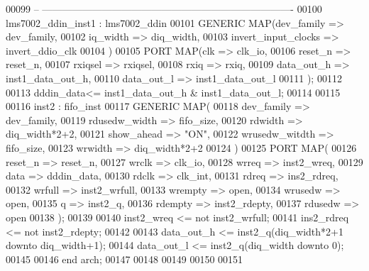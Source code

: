 \begin{DoxyCode}
00099 \textcolor{keyword}{-- ----------------------------------------------------------------------------}
00100 lms7002_ddin_inst1 : lms7002_ddin
00101 \textcolor{keywordflow}{GENERIC} \textcolor{keywordflow}{MAP}(dev_family              => dev_family,
00102                 iq_width                => diq_width,
00103                 invert_input_clocks => invert_ddio_clk
00104             \textcolor{vhdlchar}{)}
00105 \textcolor{keywordflow}{PORT} \textcolor{keywordflow}{MAP}(clk        => clk_io,
00106          reset_n    => reset_n,
00107          rxiqsel    => rxiqsel,
00108          rxiq       => rxiq,
00109          data_out_h => inst1_data_out_h,
00110          data_out_l => inst1_data_out_l
00111          \textcolor{vhdlchar}{)};
00112          
00113 \textcolor{vhdlchar}{dddin_data}\textcolor{vhdlchar}{<=} \textcolor{vhdlchar}{inst1_data_out_h} \textcolor{vhdlchar}{&} \textcolor{vhdlchar}{inst1_data_out_l};    
00114          
00115          
00116 inst2 : fifo_inst
00117 \textcolor{keywordflow}{GENERIC} \textcolor{keywordflow}{MAP}(
00118             dev_family      => dev_family,
00119             rdusedw_width   => fifo_size,
00120             rdwidth             => diq\_width*2+2,
00121             show_ahead      => \textcolor{keyword}{"ON"},
00122             wrusedw_witdth => fifo_size,
00123             wrwidth             => diq\_width*2+2
00124             \textcolor{vhdlchar}{)}
00125 \textcolor{keywordflow}{PORT} \textcolor{keywordflow}{MAP}(
00126             reset_n             => reset_n,
00127             wrclk           => clk_io,
00128             wrreq           => inst2_wreq,
00129             data                => dddin_data,
00130             rdclk           => clk_int,
00131             rdreq           => ins2_rdreq,
00132             wrfull          => inst2_wrfull,
00133             wrempty         => \textcolor{keywordflow}{open},
00134             wrusedw         => \textcolor{keywordflow}{open}, 
00135             q                   => inst2_q,
00136             rdempty             => inst2_rdepty,
00137             rdusedw             => \textcolor{keywordflow}{open}
00138             \textcolor{vhdlchar}{)};       
00139 
00140 inst2\_wreq <= \textcolor{keywordflow}{not} inst2\_wrfull;
00141 \textcolor{vhdlchar}{ins2_rdreq} \textcolor{vhdlchar}{<=} \textcolor{keywordflow}{not} \textcolor{vhdlchar}{inst2_rdepty};
00142 
00143 \textcolor{vhdlchar}{data_out_h} \textcolor{vhdlchar}{<=} \textcolor{vhdlchar}{inst2_q}\textcolor{vhdlchar}{(}\textcolor{vhdlchar}{diq_width}\textcolor{vhdlchar}{*}\textcolor{vhdllogic}{}\textcolor{vhdllogic}{2+1} \textcolor{keywordflow}{downto} \textcolor{vhdlchar}{diq_width}\textcolor{vhdlchar}{+}\textcolor{vhdllogic}{}\textcolor{vhdllogic}{1}\textcolor{vhdlchar}{)};
00144 \textcolor{vhdlchar}{data_out_l} \textcolor{vhdlchar}{<=} \textcolor{vhdlchar}{inst2_q}\textcolor{vhdlchar}{(}\textcolor{vhdlchar}{diq_width} \textcolor{keywordflow}{downto} \textcolor{vhdllogic}{}\textcolor{vhdllogic}{0}\textcolor{vhdlchar}{)};
00145   
00146 \textcolor{keywordflow}{end} \textcolor{vhdlchar}{arch};
00147 
00148 
00149 
00150 
00151 
\end{DoxyCode}
